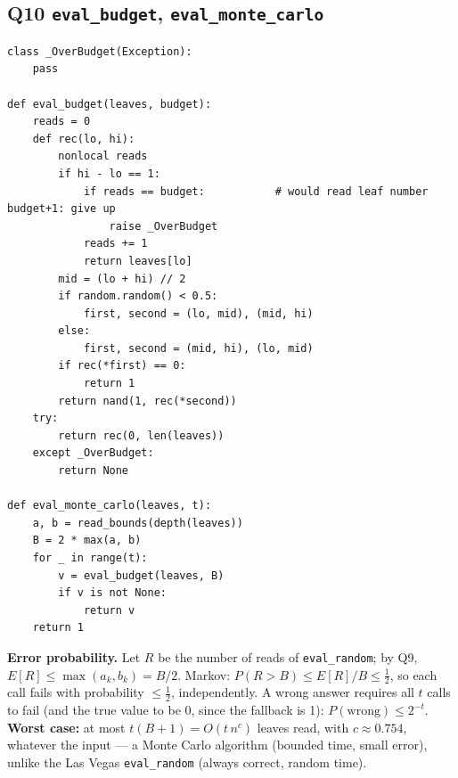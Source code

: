 \documentclass[11pt,a4paper]{article}
\newcommand{\pts}[3]{\fcolorbox{#3}{white}{\color{#3}\textbf{#1\,/\,#2}}}
\begin{document}
\subsection*{Q10 \quad \texttt{eval\_budget}, \texttt{eval\_monte\_carlo} \hfill \pts{0}{2}{none}}
\begin{lstlisting}
class _OverBudget(Exception):
    pass

def eval_budget(leaves, budget):
    reads = 0
    def rec(lo, hi):
        nonlocal reads
        if hi - lo == 1:
            if reads == budget:           # would read leaf number budget+1: give up
                raise _OverBudget
            reads += 1
            return leaves[lo]
        mid = (lo + hi) // 2
        if random.random() < 0.5:
            first, second = (lo, mid), (mid, hi)
        else:
            first, second = (mid, hi), (lo, mid)
        if rec(*first) == 0:
            return 1
        return nand(1, rec(*second))
    try:
        return rec(0, len(leaves))
    except _OverBudget:
        return None

def eval_monte_carlo(leaves, t):
    a, b = read_bounds(depth(leaves))
    B = 2 * max(a, b)
    for _ in range(t):
        v = eval_budget(leaves, B)
        if v is not None:
            return v
    return 1
\end{lstlisting}
\textbf{Error probability.} Let $R$ be the number of reads of \texttt{eval\_random}; by Q9,
$E[R]\le\max(a_k,b_k)=B/2$. Markov: $P(R>B)\le E[R]/B\le\frac12$, so each call fails with
probability $\le\frac12$, independently. A wrong answer requires all $t$ calls to fail (and the true
value to be 0, since the fallback is 1): $P(\text{wrong})\le2^{-t}$.
\textbf{Worst case:} at most $t(B+1)=O(t\,n^{c})$ leaves read, with $c\approx0.754$, whatever the
input --- a Monte Carlo algorithm (bounded time, small error), unlike the Las Vegas
\texttt{eval\_random} (always correct, random time).

\end{document}
